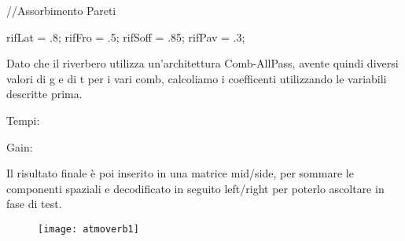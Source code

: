 \begin{code}
//Assorbimento Pareti

rifLat = .8;
rifFro = .5;
rifSoff = .85;
rifPav = .3;
\end{code}

Dato che il riverbero utilizza un'architettura Comb-AllPass, avente quindi diversi valori di g e di t
per i vari comb, calcoliamo i coefficenti utilizzando le variabili descritte prima.

\bigskip

Tempi:



Gain:



\pagebreak

Il risultato finale è poi inserito in una matrice mid/side, per sommare le componenti spaziali
e decodificato in seguito left/right per poterlo ascoltare in fase di test.




\begin{figure}[htp]
\centering
\texttt{[image: atmoverb1]}
\label{fig:atmoverb}
\end{figure}
